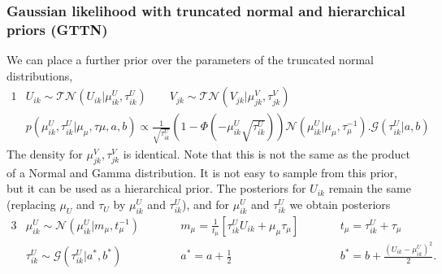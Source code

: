 \documentclass{article}
\begin{document}
		\subsubsection{Gaussian likelihood with truncated normal and hierarchical priors (GTTN)}
		We can place a further prior over the parameters of the truncated normal distributions,
		\begin{alignat*}{1}
			&U_{ik} \sim \mathcal{TN} ( U_{ik} | \mu^U_{ik}, \tau^U_{ik} )		\quad\quad	V_{jk} \sim \mathcal{TN} ( V_{jk} | \mu^V_{jk}, \tau^V_{jk} )  \\
			&p(\mu^U_{ik}, \tau^U_{ik} | \mu_{\mu}, \tau{\mu}, a, b) \propto \frac{1}{\sqrt{\tau^U_{ik}}} \left( 1 - \Phi ( - \mu^U_{ik} \sqrt{\tau^U_{ik}} ) \right) \mathcal{N} (\mu^U_{ik} | \mu_{\mu}, \tau_{\mu}^{-1} ). \mathcal{G} (\tau^U_{ik} | a, b)
		\end{alignat*}
		The density for $\mu^V_{jk}, \tau^V_{jk}$ is identical. Note that this is not the same as the product of a Normal and Gamma distribution. It is not easy to sample from this prior, but it can be used as a hierarchical prior. The posteriors for $U_{ik}$ remain the same (replacing $\mu_U$ and $\tau_U$ by $\mu^U_{ik}$ and $\tau^U_{ik}$), and for $\mu^U_{ik}$ and $ \tau^U_{ik}$ we obtain posteriors
		\begin{alignat*}{3}
			& \mu^U_{ik} \sim \mathcal{N} (\mu^U_{ik} | m_{\mu}, t_{\mu}^{-1} )
			\quad\quad && m_{\mu} = \frac{1}{t_{\mu}} \left[ \tau^U_{ik} U_{ik} + \mu_{\mu} \tau_{\mu} \right] 
			\quad\quad && t_{\mu} = \tau^U_{ik} + \tau_{\mu} \\
			& \tau^U_{ik} \sim \mathcal{G} (\tau^U_{ik} | a^*, b^* )
			\quad\quad && a^* = a + \frac{1}{2} 
			\quad\quad && b^* = b + \frac{(U_{ik} - \mu^U_{ik})^2}{2}.
		\end{alignat*}
		
\end{document}
